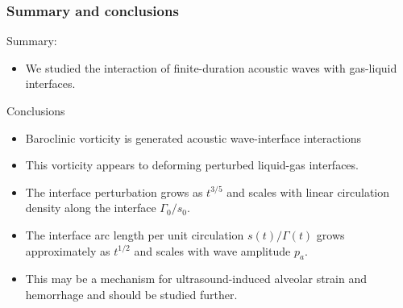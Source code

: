 \begin{frame} \frametitle{\vspace*{0.5cm}Summary and conclusions}
  \small
  Summary:
  \begin{itemize}
  \item We studied the interaction of finite-duration acoustic waves with gas-liquid interfaces.
  \end{itemize}
  \vspace*{0.25cm}
  Conclusions
  \begin{itemize}
  \item Baroclinic vorticity is generated acoustic wave-interface interactions%
  \item This vorticity appears to deforming perturbed liquid-gas interfaces.%
  \item The interface perturbation grows as $t^{3/5}$ and scales with linear circulation density along the interface $\Gamma_0 / s_0$.
  \item The interface arc length per unit circulation $s(t)/\Gamma(t)$ grows approximately as $t^{1/2}$ and scales with wave amplitude $p_a$.
  \item This may be a mechanism for ultrasound-induced alveolar strain and hemorrhage and should be studied further.
  \end{itemize}
\end{frame}
